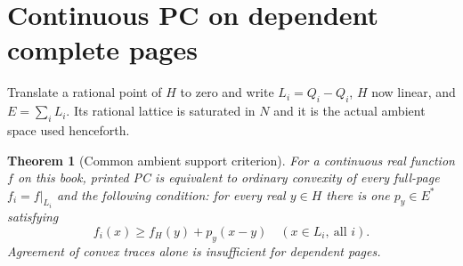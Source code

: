 \documentclass[11pt]{article}
\newtheorem{theorem}{Theorem}[section]
\begin{document}
\section{Continuous PC on dependent complete pages}\label{sec:criterion}
Translate a rational point of $H$ to zero and write $L_i=Q_i-Q_i$, $H$ now linear, and $E=\sum_iL_i$. Its rational lattice is saturated in $N$ and it is the actual ambient space used henceforth.

\begin{theorem}[Common ambient support criterion]\label{thm:criterion}
For a continuous real function $f$ on this book, printed PC is equivalent to ordinary convexity of every full-page $f_i=f|_{L_i}$ and the following condition: for every real $y\in H$ there is one $p_y\in E^*$ satisfying
\[
 f_i(x)\geq f_H(y)+p_y(x-y)\quad(x\in L_i,\ \text{all }i).                 \tag{CS}
\]
Agreement of convex traces alone is insufficient for dependent pages.
\end{theorem}
\end{document}
